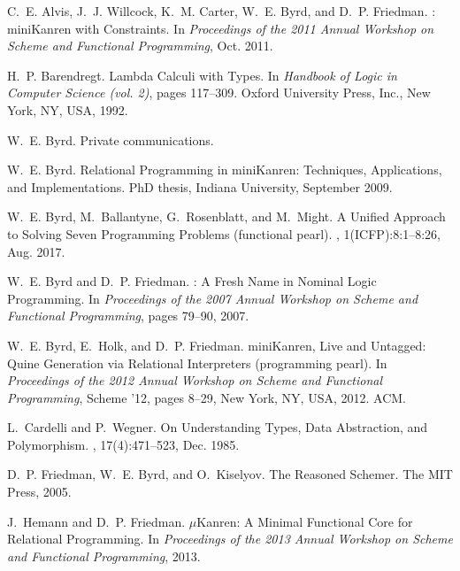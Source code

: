 \documentclass{llncs}
\begin{document}
\begin{thebibliography}{10}

C.~E. Alvis, J.~J. Willcock, K.~M. Carter, W.~E. Byrd, and D.~P. Friedman.
: {miniKanren} with Constraints.
\newblock In {\em Proceedings of the 2011 Annual Workshop on Scheme and
  Functional Programming}, Oct. 2011.

H.~P. Barendregt.
\newblock Lambda Calculi with Types.
\newblock In {\em Handbook of Logic in Computer Science (vol. 2)}, 
pages 117--309. Oxford University Press, Inc., New York, NY, USA, 1992.

W.~E. Byrd.
\newblock Private communications.

W.~E. Byrd.
\newblock Relational Programming in miniKanren: Techniques, Applications,
  and Implementations.
\newblock PhD thesis, Indiana University, September 2009.

W.~E. Byrd, M.~Ballantyne, G.~Rosenblatt, and M.~Might.
\newblock A Unified Approach to Solving Seven Programming Problems (functional
  pearl).
, 1(ICFP):8:1--8:26, Aug. 2017.

W.~E. Byrd and D.~P. Friedman.
: A Fresh Name in Nominal Logic Programming.
\newblock In {\em Proceedings of the 2007 Annual Workshop on Scheme and
  Functional Programming}, pages 79--90, 2007.

W.~E. Byrd, E.~Holk, and D.~P. Friedman.
\newblock miniKanren, Live and Untagged: Quine Generation via Relational
  Interpreters (programming pearl).
\newblock In {\em Proceedings of the 2012 Annual Workshop on Scheme and
  Functional Programming}, Scheme '12, pages 8--29, New York, NY, USA, 2012.
  ACM.

L.~Cardelli and P.~Wegner.
\newblock On Understanding Types, Data Abstraction, and Polymorphism.
, 17(4):471--523, Dec. 1985.

D.~P. Friedman, W.~E. Byrd, and O.~Kiselyov.
\newblock The Reasoned Schemer.
\newblock The MIT Press, 2005.

J.~Hemann and D.~P. Friedman.
\newblock $\mu$Kanren: A Minimal Functional Core for Relational Programming.
\newblock In {\em Proceedings of the 2013 Annual Workshop on Scheme and
  Functional Programming}, 2013.


\end{thebibliography}
\end{document}
